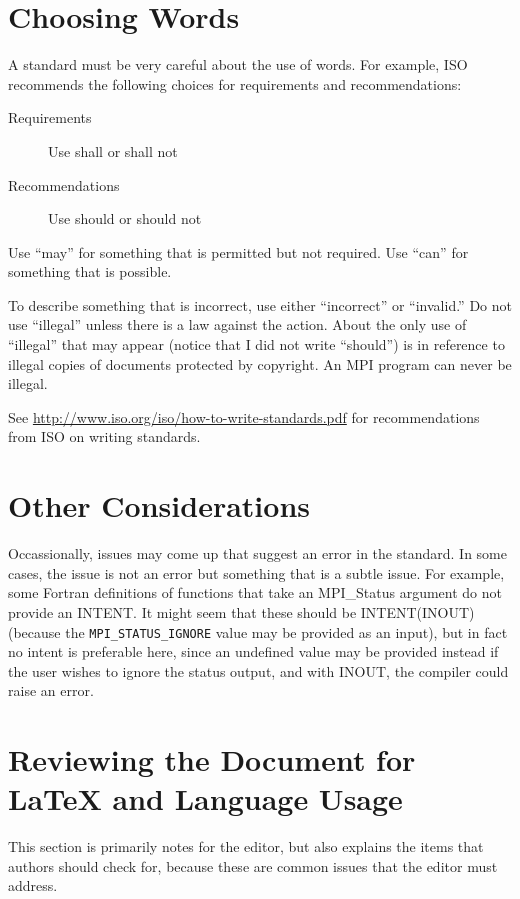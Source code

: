 \documentclass[letterpaper,twoside,11pt,fleqn]{article}
\def\MPI/{\textsf{MPI}}    %
\begin{document}
\section{Choosing Words}\label{sec:choosing-words}
A standard must be very careful about the use of words.  For example, ISO
recommends the following choices for requirements and recommendations:
\begin{description}
\item[Requirements]Use shall or shall not
\item[Recommendations]Use should or should not
\end{description}
Use ``may'' for something that is permitted but not required.
Use ``can'' for something that is possible.

To describe something that is incorrect, use either ``incorrect'' or
``invalid.''
Do not use ``illegal'' unless there is a law against the action.
About the only use of ``illegal'' that may appear (notice that I did not
write ``should'') is in reference to illegal copies of documents
protected by copyright.  An \MPI/ program can never be illegal.

See \url{http://www.iso.org/iso/how-to-write-standards.pdf} for
recommendations from ISO on writing standards.

\section{Other Considerations}\label{sec:other}
Occassionally, issues may come up that suggest an error in the standard.
In some cases, the issue is not an error but something that is a subtle issue.
For example, some Fortran definitions of functions that take an
\textsf{MPI\_Status} argument do not provide an \textsf{INTENT}.
It might seem that these should be \textsf{INTENT(INOUT)} (because the
\texttt{MPI\_STATUS\_IGNORE} value may be provided as an input), but
in fact no intent is preferable here, since an undefined value may be
provided instead if the user wishes to ignore the status output, and
with \textsf{INOUT}, the compiler could raise an error.

\section{Reviewing the Document for LaTeX and Language Usage}
\label{sec:reviewing}
This section is primarily notes for the editor, but also explains the
items that authors should check for, because these are common issues
that the editor must address.
\end{document}

